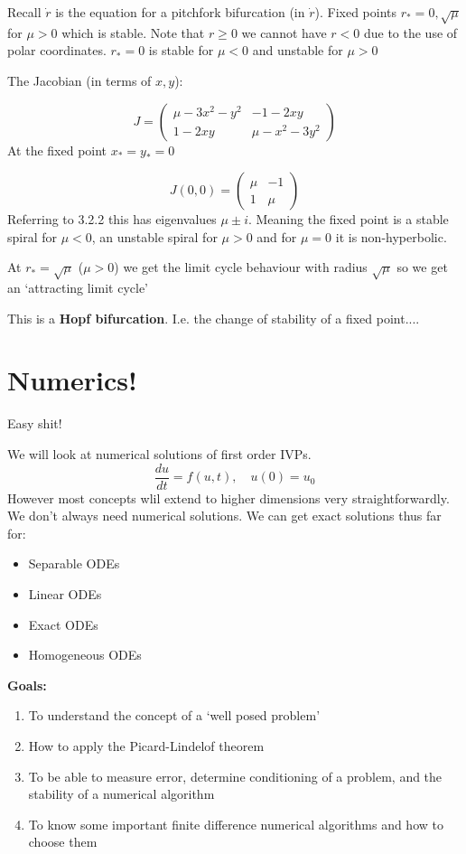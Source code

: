 \documentclass{X:/Documents/Coding/Latex/myassignment}
\begin{document}
Recall $\dot r$ is the equation for a pitchfork bifurcation (in $\dot r$).
Fixed points $r_*=0,\sqrt{\mu}$ for $\mu > 0$ which is stable. Note that $r \geq0$ we cannot have $r<0$ due to the use of polar coordinates. 
$r_*=0$ is stable for $\mu <0$ and unstable for $\mu >0$


The Jacobian (in terms of $x,y$):

    
\[J = \begin{pmatrix}
    \mu -3x^2 - y^2 &-1 -2xy\\
    1-2xy & \mu - x^2 - 3y^2
\end{pmatrix}\]
At the fixed point $x_*=y_*=0$ 

\[J(0,0) = \begin{pmatrix}
    \mu&-1\\1&\mu
\end{pmatrix}\]
Referring to 3.2.2 this has eigenvalues $\mu\pm i$. Meaning the fixed point is a stable spiral for $\mu <0$, an unstable spiral for $\mu > 0$ and for $\mu =0$ it is non-hyperbolic.

At $r_* = \sqrt{\mu}$ ($\mu > 0$) we get the limit cycle behaviour with radius $\sqrt{\mu}$ so we get an `attracting limit cycle'

This is a \textbf{Hopf bifurcation}. I.e. the change of stability of a fixed point....







\section{Numerics!}
Easy shit!

We will look at numerical solutions of first order IVPs.
\[\frac{du}{dt} = f(u,t), \quad u(0) = u_0\]
However most concepts wlil extend to higher dimensions very straightforwardly.
We don't always need numerical solutions. We can get exact solutions thus far for:
\begin{itemize}
    \item Separable ODEs
    \item Linear ODEs
    \item Exact ODEs
    \item Homogeneous ODEs 
\end{itemize}

\textbf{Goals:}
\begin{enumerate}
    \item To understand the concept of a `well posed problem'
    \item How to apply the Picard-Lindelof theorem
    \item To be able to measure error, determine conditioning of a problem, and the stability of a numerical algorithm
    \item To know some important finite difference numerical algorithms and how to choose them 
\end{enumerate}
\end{document}

